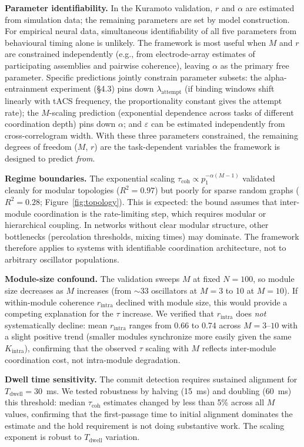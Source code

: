 \documentclass[12pt]{article}
\begin{document}
\textbf{Parameter identifiability.} In the Kuramoto validation, $r$ and $\alpha$ are estimated from simulation data; the remaining parameters are set by model construction. For empirical neural data, simultaneous identifiability of all five parameters from behavioural timing alone is unlikely. The framework is most useful when $M$ and $r$ are constrained independently (e.g., from electrode-array estimates of participating assemblies and pairwise coherence), leaving $\alpha$ as the primary free parameter. Specific predictions jointly constrain parameter subsets: the alpha-entrainment experiment (\S4.3) pins down $\lambda_{\mathrm{attempt}}$ (if binding windows shift linearly with tACS frequency, the proportionality constant gives the attempt rate); the $M$-scaling prediction (exponential dependence across tasks of different coordination depth) pins down $\alpha$; and $\varepsilon$ can be estimated independently from cross-correlogram width. With these three parameters constrained, the remaining degrees of freedom ($M$, $r$) are the task-dependent variables the framework is designed to predict \emph{from}.

\textbf{Regime boundaries.} The exponential scaling $\tau_{\text{coh}} \propto p_1^{-\alpha(M-1)}$ validated cleanly for modular topologies ($R^2 = 0.97$) but poorly for sparse random graphs ($R^2 = 0.28$; Figure~\ref{fig:topology}). This is expected: the bound assumes that inter-module coordination is the rate-limiting step, which requires modular or hierarchical coupling. In networks without clear modular structure, other bottlenecks (percolation thresholds, mixing times) may dominate. The framework therefore applies to systems with identifiable coordination architecture, not to arbitrary oscillator populations.

\textbf{Module-size confound.} The validation sweeps $M$ at fixed $N = 100$, so module size decreases as $M$ increases (from $\sim$33 oscillators at $M = 3$ to 10 at $M = 10$). If within-module coherence $r_{\mathrm{intra}}$ declined with module size, this would provide a competing explanation for the $\tau$ increase. We verified that $r_{\mathrm{intra}}$ does \emph{not} systematically decline: mean $r_{\mathrm{intra}}$ ranges from 0.66 to 0.74 across $M = 3$--$10$ with a slight positive trend (smaller modules synchronize more easily given the same $K_{\mathrm{intra}}$), confirming that the observed $\tau$ scaling with $M$ reflects inter-module coordination cost, not intra-module degradation.

\textbf{Dwell time sensitivity.} The commit detection requires sustained alignment for $T_{\mathrm{dwell}} = 30$~ms. We tested robustness by halving (15~ms) and doubling (60~ms) this threshold: median $\tau_{\mathrm{coh}}$ estimates changed by less than 5\% across all $M$ values, confirming that the first-passage time to initial alignment dominates the estimate and the hold requirement is not doing substantive work. The scaling exponent is robust to $T_{\mathrm{dwell}}$ variation.
\end{document}
